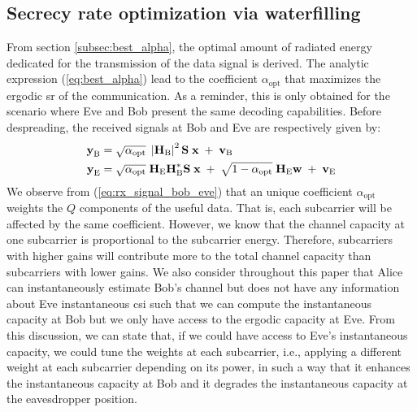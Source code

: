 \subsection{Secrecy rate optimization via waterfilling}
\label{subsec:perf_waterf}
From section \ref{subsec:best_alpha}, the optimal amount of radiated energy dedicated for the transmission of the data signal is derived. The analytic expression (\ref{eq:best_alpha}) lead to the coefficient $\alpha_{\text{opt}}$ that maximizes the ergodic \gls{sr} of the communication. As a reminder, this is only obtained for the scenario where Eve and Bob present the same decoding capabilities. Before despreading, the received signals at Bob and Eve are respectively given by:
\begin{equation}
    \begin{split}
        \textbf{y}_{\text{B}} &= \sqrt{\alpha_{\text{opt}}} \; \left|\textbf{H}_{\text{B}}\right|^2 \textbf{S}\; \textbf{x} \; +  \;  \textbf{v}_{\text{B}} \\
        \textbf{y}_{\text{E}} &= \sqrt{\alpha_{\text{opt}}} \; \textbf{H}_{\text{E}} \textbf{H}^*_{\text{B}} \textbf{S}\; \textbf{x} \; +  \; \sqrt{1-\alpha_{\text{opt}}} \; \textbf{H}_{\text{E}} \textbf{w}  \; +  \;  \textbf{v}_{\text{E}}
    \end{split}
    \label{eq:rx_signal_bob_eve}
\end{equation}
We observe from (\ref{eq:rx_signal_bob_eve}) that an unique coefficient $\alpha_{\text{opt}}$ weights the $Q$ components of the useful data. That is, each subcarrier will be affected by the same coefficient. However, we know that the channel capacity at one subcarrier is proportional to the subcarrier energy. Therefore, subcarriers with higher gains will contribute more to the total channel capacity than subcarriers with lower gains. We also consider throughout this paper that Alice can instantaneously estimate Bob's channel but does not have any information about Eve instantaneous \gls{csi} such that we can compute the instantaneous capacity at Bob but we only have access to the ergodic capacity at Eve. From this discussion, we can state that, if we could have access to Eve's instantaneous capacity, we could tune the weights at each subcarrier, i.e., applying a different weight at each subcarrier depending on its power, in such a way that it enhances the instantaneous capacity at Bob and it degrades the instantaneous capacity at the eavesdropper position. \\

